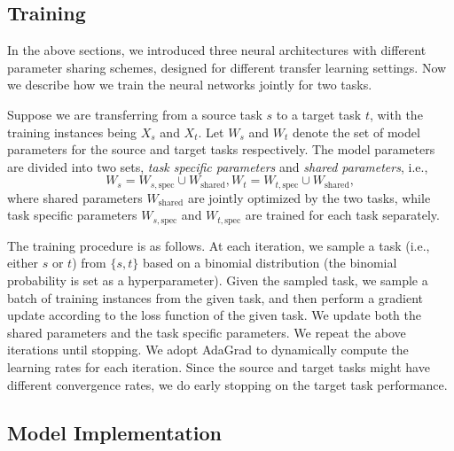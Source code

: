\documentclass{article} \usepackage{iclr2017_conference,times}
\begin{document}
\subsection{Training}

In the above sections, we introduced three neural architectures with different parameter sharing schemes, designed for different transfer learning settings. Now we describe how we train the neural networks jointly for two tasks.

Suppose we are transferring from a source task $s$ to a target task $t$, with the training instances being $X_s$ and $X_t$. Let $W_s$ and $W_t$ denote the set of model parameters for the source and target tasks respectively. The model parameters are divided into two sets, \textit{task specific parameters} and \textit{shared parameters}, i.e.,
\[
W_s = W_{s, \mbox{spec}} \cup W_{\mbox{shared}}, W_t = W_{t, \mbox{spec}} \cup W_{\mbox{shared}},
\]
where shared parameters $W_{\mbox{shared}}$ are jointly optimized by the two tasks, while task specific parameters $W_{s, \mbox{spec}}$ and $W_{t, \mbox{spec}}$ are trained for each task separately.

The training procedure is as follows. At each iteration, we sample a task (i.e., either $s$ or $t$) from $\{s, t\}$ based on a binomial distribution (the binomial probability is set as a hyperparameter). Given the sampled task, we sample a batch of training instances from the given task, and then perform a gradient update according to the loss function of the given task. We update both the shared parameters and the task specific parameters. We repeat the above iterations until stopping. We adopt AdaGrad \citep{duchi2011adaptive} to dynamically compute the learning rates for each iteration. Since the source and target tasks might have different convergence rates, we do early stopping on the target task performance.

\subsection{Model Implementation} \label{sec:imp}
\end{document}
